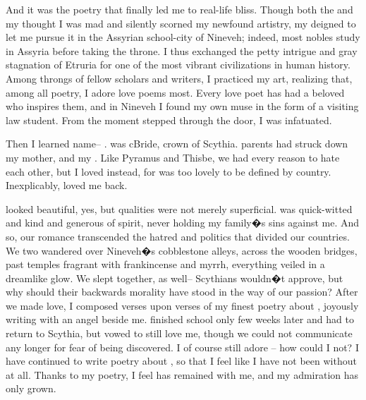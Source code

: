 \documentclass[char]{Kos}
\begin{document}
And it was the poetry that finally led me to real-life bliss. Though both the \cEtruriaKing{\monarch} and my \cGroom{\nickname} thought I was mad and silently scorned my newfound artistry, my \cEtruriaKing{\parent} deigned to let me pursue it in the Assyrian school-city of Nineveh; indeed, most nobles study in Assyria before taking the throne. I thus exchanged the petty intrigue and gray stagnation of Etruria for one of the most vibrant civilizations in human history. Among throngs of fellow scholars and writers, I practiced my art, realizing that, among all poetry, I adore love poems most. Every love poet has had a beloved who inspires them, and in Nineveh I found my own muse in the form of a visiting law student. From the moment \cBride{\they} stepped through the door, I was infatuated.

Then I learned \cBride{\their} name-- \cBride{\nickname}. \cBride{\They} was cBride{\nickname}, crown \cBride{\prince} of Scythia. \cBride{\Their} parents had struck down my mother, and my \cEtruriaKing{\parent} \cBride{\their} \cFugitive{\sibling}. Like Pyramus and Thisbe, we had every reason to hate each other, but I loved \cBride{\them} instead, for \cBride{\they} was too lovely to be defined by \cBride{\their} country. Inexplicably, \cBride{\they} loved me back.

\cBride{\nickname} looked beautiful, yes, but \cBride{\their} qualities were not merely superficial. \cBride{\They} was quick-witted and kind and generous of spirit, never holding my family�s sins against me. And so, our romance transcended the hatred and politics that divided our countries. We two wandered over Nineveh�s cobblestone alleys, across the wooden bridges, past temples fragrant with frankincense and myrrh, everything veiled in a dreamlike glow. We slept together, as well-- Scythians wouldn�t approve, but why should their backwards morality have stood in the way of our passion? After we made love, I composed verses upon verses of my finest poetry about \cBride{\them}, joyously writing with an angel beside me. \cBride{\They} finished school only few weeks later and had to return to Scythia, but \cBride{\they} vowed to still love me, though we could not communicate any longer for fear of being discovered. I of course still adore \cBride{\them}-- how could I not? I have continued to write poetry about \cBride{\them}, so that I feel like I have not been without \cBride{\them} at all. Thanks to my poetry, I feel \cBride{\they} has remained with me, and my admiration has only grown.
\end{document}
